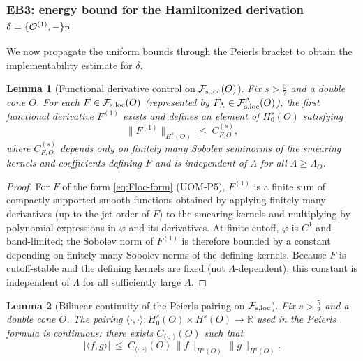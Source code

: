 \documentclass[10pt]{article}
\newcommand{\Fsloc}{\mathcal F_{\rm s.loc}}
\theoremstyle{definition}
\theoremstyle{plain}
\newtheorem{lemma}{Lemma}[section]
\begin{document}

\subsubsection*{EB3: energy bound for the Hamiltonized derivation $\delta=\{\mathcal O^{(1)},-\}_{\rm P}$}

We now propagate the uniform bounds through the Peierls bracket to obtain the implementability estimate for $\delta$.

\begin{lemma}[Functional derivative control on $\Fsloc(O)$]
\label{lem:FD}
Fix $s>\frac52$ and a double cone $O$.  For each $F\in\Fsloc(O)$ (represented by $F_\Lambda\in\mathcal F_{\rm s.loc}^\Lambda(O)$),
the first functional derivative $F^{(1)}$ exists and defines an element of $H^s_0(O)$ satisfying
\begin{equation}
\|F^{(1)}\|_{H^s(O)}\ \le\ C^{(s)}_{F,O},
\label{eq:FD-bound}
\end{equation}
where $C^{(s)}_{F,O}$ depends only on finitely many Sobolev seminorms of the smearing kernels and coefficients defining $F$ and is independent
of $\Lambda$ for all $\Lambda\ge\Lambda_O$.
\end{lemma}

\begin{proof}
For $F$ of the form \eqref{eq:Floc-form} (UOM-P5), $F^{(1)}$ is a finite sum of compactly supported smooth functions obtained by applying finitely
many derivatives (up to the jet order of $F$) to the smearing kernels and multiplying by polynomial expressions in $\varphi$ and its derivatives.
At finite cutoff, $\varphi$ is $C^1$ and band-limited; the Sobolev norm of $F^{(1)}$ is therefore bounded by a constant depending on finitely
many Sobolev norms of the defining kernels.  Because $F$ is cutoff-stable and the defining kernels are fixed (not $\Lambda$-dependent), this
constant is independent of $\Lambda$ for all sufficiently large $\Lambda$.
\end{proof}

\begin{lemma}[Bilinear continuity of the Peierls pairing on $\Fsloc$]
\label{lem:pairing-cont}
Fix $s>\frac52$ and a double cone $O$.  The pairing
\(
\langle \cdot,\cdot\rangle: H^s_0(O)\times H^s(O)\to\mathbb R
\)
used in the Peierls formula is continuous: there exists $C_{\langle\cdot,\cdot\rangle}(O)$ such that
\[
|\langle f,g\rangle|\ \le\ C_{\langle\cdot,\cdot\rangle}(O)\,\|f\|_{H^s(O)}\,\|g\|_{H^s(O)}.
\]
\end{lemma}
\end{document}
